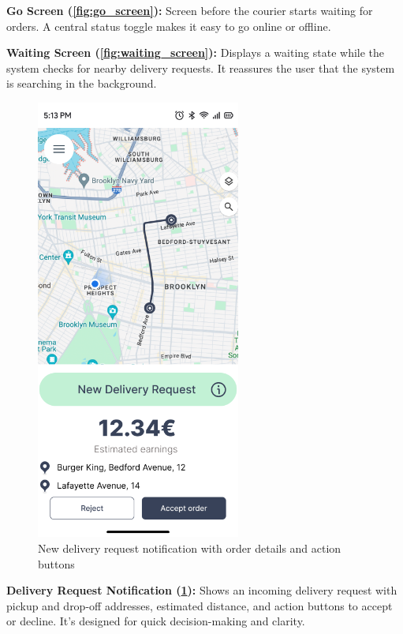 \textbf{Go Screen (\ref{fig:go_screen}):}  
Screen before the courier starts waiting for orders. A central status toggle makes it easy to go online or offline.

\textbf{Waiting Screen (\ref{fig:waiting_screen}):}  
Displays a waiting state while the system checks for nearby delivery requests. It reassures the user that the system is searching in the background.

\begin{figure}[H]
    \centering
    \includegraphics[width=0.6\textwidth]{images/delivery_request.png}
    \caption{New delivery request notification with order details and action buttons}
    \label{fig:delivery_request}
\end{figure}

\textbf{Delivery Request Notification (\ref{fig:delivery_request}):}  
Shows an incoming delivery request with pickup and drop-off addresses, estimated distance, and action buttons to accept or decline. It’s designed for quick decision-making and clarity.


